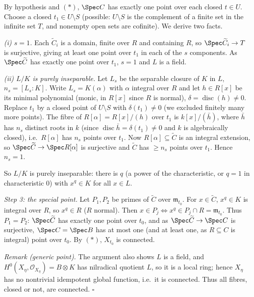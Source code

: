 \documentclass[11pt]{article}
\begin{document}
By hypothesis and $(*)$, $\Spec C$ has exactly one point over each closed $t\in U$. Choose a closed $t_1\in U\setminus S$ (possible: $U\setminus S$ is the complement of a finite set in the infinite set $T$, and nonempty open sets are cofinite). We derive two facts.

\emph{(i) $s=1$.} Each $\widetilde C_i$ is a domain, finite over $R$ and containing $R$, so $\Spec\widetilde C_i\to T$ is surjective, giving at least one point over $t_1$ in each of the $s$ components. As $\Spec\widetilde C$ has exactly one point over $t_1$, $s=1$ and $L$ is a field.

\emph{(ii) $L/K$ is purely inseparable.} Let $L_s$ be the separable closure of $K$ in $L$, $n_s=[L_s:K]$. Write $L_s=K(\alpha)$ with $\alpha$ integral over $R$ and let $h\in R[x]$ be its minimal polynomial (monic, in $R[x]$ since $R$ is normal), $\delta=\operatorname{disc}(h)\neq0$. Replace $t_1$ by a closed point of $U\setminus S$ with $\delta(t_1)\ne0$ (we excluded finitely many more points). The fibre of $R[\alpha]=R[x]/(h)$ over $t_1$ is $k[x]/(\bar h)$, where $\bar h$ has $n_s$ distinct roots in $k$ (since $\operatorname{disc}\bar h=\delta(t_1)\ne0$ and $k$ is algebraically closed), i.e.\ $R[\alpha]$ has $n_s$ points over $t_1$. Now $R[\alpha]\subseteq\widetilde C$ is an integral extension, so $\Spec\widetilde C\to\Spec R[\alpha]$ is surjective and $\widetilde C$ has $\ge n_s$ points over $t_1$. Hence $n_s=1$.

So $L/K$ is purely inseparable: there is $q$ (a power of the characteristic, or $q=1$ in characteristic $0$) with $x^q\in K$ for all $x\in L$.

\emph{Step 3: the special point.} Let $P_1,P_2$ be primes of $\widetilde C$ over $\mathfrak m_{t_0}$. For $x\in\widetilde C$, $x^q\in K$ is integral over $R$, so $x^q\in R$ ($R$ normal). Then $x\in P_j\iff x^q\in P_j\cap R=\mathfrak m_{t_0}$. Thus $P_1=P_2$: $\Spec\widetilde C$ has exactly one point over $t_0$, and as $\Spec\widetilde C\to\Spec C$ is surjective, $\Spec C=\Spec B$ has at most one (and at least one, as $R\subseteq C$ is integral) point over $t_0$. By $(*)$, $X_{t_0}$ is connected.

\emph{Remark (generic point).} The argument also shows $L$ is a field, and $H^0(X_\eta,\mathcal O_{X_\eta})=B\otimes K$ has nilradical quotient $L$, so it is a local ring; hence $X_\eta$ has no nontrivial idempotent global function, i.e.\ it is connected. Thus all fibres, closed or not, are connected. \hfill$\square$
\end{document}
